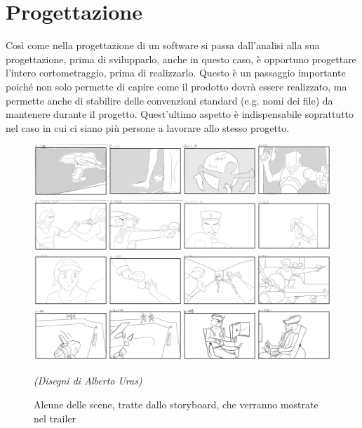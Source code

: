 
\chapter{Progettazione} %

\label{Chapter4} %

Così come nella progettazione di un software si passa dall'analisi alla sua progettazione, prima di svilupparlo, anche in questo caso, è opportuno progettare l'intero cortometraggio, prima di realizzarlo.
Questo è un passaggio importante poiché non solo permette di capire come il prodotto dovrà essere realizzato, ma permette anche di stabilire delle convenzioni standard (e.g. nomi dei file) da mantenere durante il progetto.
Quest'ultimo aspetto è indispensabile soprattutto nel caso in cui ci siano più persone a lavorare allo stesso progetto.

\begin{figure}[ht]
\centering
\includegraphics[width=.8\textwidth]{Figures/stripe1}\\[40px]
\includegraphics[width=.8\textwidth]{Figures/stripe2}\\[40px]
\includegraphics[width=.8\textwidth]{Figures/stripe3}\\[40px]
\includegraphics[width=.8\textwidth]{Figures/stripe4}\\[10px]
  \begin{minipage}{.8\textwidth}
  \footnotesize
  \emph{(Disegni di Alberto Uras)}
  \end{minipage}
\decoRule
\caption[Storyboard]{Alcune delle scene, tratte dallo storyboard, che verranno mostrate nel trailer}
\label{fig:story}
\end{figure}

